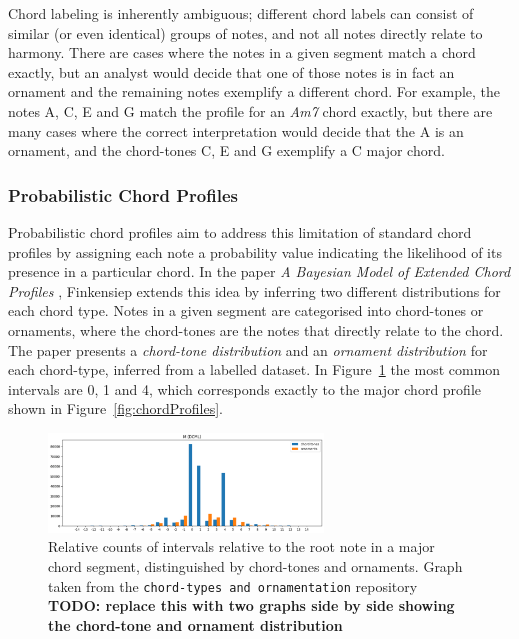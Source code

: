 \documentclass[12pt,a4paper,twoside,openany]{report} \usepackage[pdfborder={0 0 0}]{hyperref}    %
\theoremstyle{definition} \newtheorem{definition}{Definition}[section]
\begin{document}
Chord labeling is inherently ambiguous; different chord labels can consist of similar (or even identical)
groups of notes, and not all notes directly relate to harmony. There are cases where the notes in a given segment
match a chord exactly, but an analyst would decide that one of those notes is in fact an ornament and the remaining
notes exemplify a different chord. For example, the notes A, C, E and G match the profile for an \textit{Am7} chord exactly, but there
are many cases where the correct interpretation would decide that the A is an ornament, and the chord-tones C, E and
G exemplify a C major chord. 

\subsubsection{Probabilistic Chord Profiles}
\label{sub:probChordProfiles}

Probabilistic chord profiles aim to address this limitation of standard chord profiles by assigning each note
a probability value indicating the likelihood of its presence in a particular chord. In the paper \textit{A Bayesian Model
of Extended Chord Profiles} \cite{finkensiepChordTypesOrnamentation2023}, Finkensiep extends this idea by inferring two different distributions for each chord type. Notes in a given segment are categorised into chord-tones or ornaments, where the
chord-tones are the notes that directly relate to the chord. The paper presents a \textit{chord-tone distribution} and an
\textit{ornament distribution} for each chord-type, inferred from a labelled dataset. In Figure~\ref{fig:probChordProfile} the most common intervals are 0, 1 and 4, which corresponds exactly to the major chord profile shown in Figure~\ref{fig:chordProfiles}. 

\begin{figure}[ht]
  \begin{center}
    \includegraphics[width=0.65\textwidth]{figs/prep/inferringHarmony/probChordProfile.png}
  \end{center}
  \caption{Relative counts of intervals relative to the root note in a major chord segment, distinguished by chord-tones
  and ornaments. Graph taken from the \texttt{chord-types and ornamentation} repository
\cite{finkensiepChordTypesOrnamentation2023} \textbf{\footnotesize TODO: replace this with two graphs side by side showing the
chord-tone and ornament distribution}}
  \label{fig:probChordProfile}
\end{figure}
\end{document}

